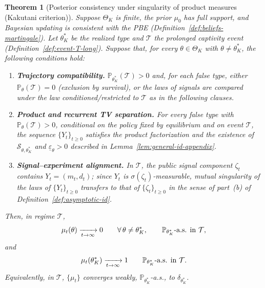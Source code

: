\documentclass[12pt,a4paper]{article}
\theoremstyle{plain}
\newtheorem{theorem}{Theorem}[section]
\theoremstyle{definition}
\theoremstyle{remark}
\newcommand{\ProbC}[1]{\mathbb{P}_{#1}}
\newcommand{\1}{\mathbf{1}}
\begin{document}
\begin{theorem}[Posterior consistency under singularity of product measures \textup{(}Kakutani criterion\textup{)}]
\label{thm:posterior-consistency-appendix}
Suppose $\Theta_K$ is finite, the prior $\mu_0$ has full support, and Bayesian updating
is consistent with the PBE \textup{(Definition~\ref{def:beliefs-martingale})}. Let
$\theta_K^\ast$ be the realized type and $\mathcal{T}$ the prolonged captivity event
\textup{(Definition~\ref{def:event-T-long})}. Suppose that, for every
$\theta\in\Theta_K$ with $\theta\neq\theta_K^\ast$, the following conditions hold:
\begin{enumerate}
  \item[\textup{(i)}] \textbf{Trajectory compatibility.}
  $\ProbC{\theta_K^\ast}(\mathcal{T})>0$ and, for each false type, either
  $\ProbC{\theta}(\mathcal{T})=0$ \textup{(exclusion by survival)}, or the laws of
  signals are compared under the law conditioned/restricted to $\mathcal{T}$ as in the
  following clauses.
  \item[\textup{(ii)}] \textbf{Product and recurrent TV separation.} For every false
  type with $\ProbC{\theta}(\mathcal{T})>0$, conditional on the policy fixed by
  equilibrium and on event $\mathcal{T}$, the sequence $\{Y_t\}_{t\ge 0}$ satisfies the
  product factorization and the existence of $\mathcal{S}_{\theta,\theta_K^\ast}$ and
  $\underline{\varepsilon}_\theta>0$ described in
  Lemma~\ref{lem:general-id-appendix}.
  \item[\textup{(iii)}] \textbf{Signal--experiment alignment.} In $\mathcal{T}$, the
  public signal component $\zeta_t$ contains $Y_t=(m_t,d_t)$; since $Y_t$ is
  $\sigma(\zeta_t)$-measurable, mutual singularity of the laws of
  $\{Y_t\}_{t\ge0}$ transfers to that of $\{\zeta_t\}_{t\ge0}$ in the sense of
  part~\textup{(b)} of Definition~\ref{def:asymptotic-id}.
\end{enumerate}
Then, in regime $\mathcal{T}$,
\[
\mu_t(\theta)\xrightarrow[t\to\infty]{}0
\qquad
\forall\,\theta\neq\theta_K^\ast,
\qquad
\ProbC{\theta_K^\ast}\textup{-a.s. in }\mathcal{T},
\]
and
\[
\mu_t(\theta_K^\ast)\xrightarrow[t\to\infty]{}1
\qquad \ProbC{\theta_K^\ast}\textup{-a.s. in }\mathcal{T}.
\]
Equivalently, in $\mathcal{T}$, $\{\mu_t\}$ converges weakly,
$\ProbC{\theta_K^\ast}$-a.s., to $\delta_{\theta_K^\ast}$.
\end{theorem}
\end{document}
